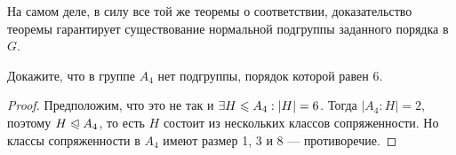 \begin{note}
	На самом деле, в силу все той же теоремы о соответствии, доказательство теоремы гарантирует существование нормальной подгруппы заданного порядка в $G$.
\end{note}

\begin{exercise}
	Докажите, что в группе $A_4$ нет подгруппы, порядок которой равен 6.
\end{exercise}

\begin{proof}
	Предположим, что это не так и $\exists H \le A_4: |H| \hm= 6$. Тогда $|A_4 : H| = 2$, поэтому $H \trianglelefteqslant A_4$, то есть $H$ состоит из нескольких классов сопряженности. Но классы сопряженности в $A_4$ имеют размер 1, 3 и 8 --- противоречие.
\end{proof}